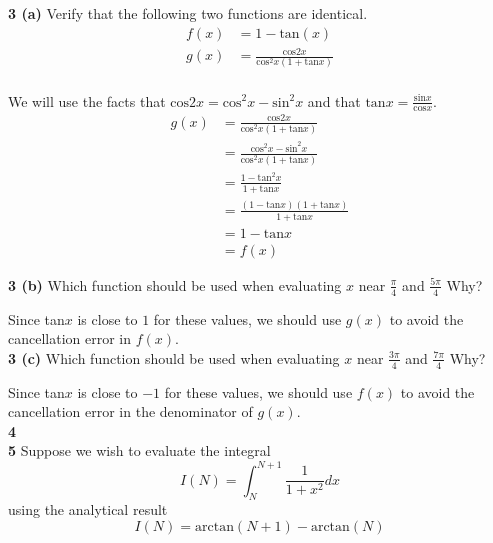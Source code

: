 \documentclass[12pt]{article}
\begin{document}
\hspace{-7 ex}\textbf{3 (a)} Verify that the following two functions are identical.\\
	\begin{align*}
		f(x) & = 1 - \text{tan}(x) \\
		g(x) & = \frac{\text{cos}2x}{\text{cos}^2x(1+\text{tan}x)} \\
	\end{align*}
	
	\bigbreak
	
	We will use the facts that $\text{cos}2x = \text{cos}^2x - \text{sin}^2x$ and that $\text{tan}x = \frac{\text{sin}x}{\text{cos}x}$. \\
	\begin{align*}
		g(x) & = \frac{\text{cos}2x}{\text{cos}^2x(1+\text{tan}x)} \\
		& = \frac{\text{cos}^2x - \text{sin}^2x}{\text{cos}^2x(1+\text{tan}x)} \\
		& = \frac{1 - \text{tan}^2x}{1+\text{tan}x} \\
		& = \frac{(1 - \text{tan}x)(1+\text{tan}x)}{1+\text{tan}x} \\
		& = 1 - \text{tan}x \\
		& = f(x)
	\end{align*}
	
\hspace{-7 ex}\textbf{3 (b)} Which function should be used when evaluating $x$ near $\frac{\pi}{4}$ and $\frac{5\pi}{4}$ Why?\bigbreak

	Since tan$x$ is close to $1$ for these values, we should use $g(x)$ to avoid the cancellation error in $f(x)$. \\

\hspace{-7 ex}\textbf{3 (c)} Which function should be used when evaluating $x$ near $\frac{3\pi}{4}$ and $\frac{7\pi}{4}$ Why?\bigbreak

	Since tan$x$ is close to $-1$ for these values, we should use $f(x)$ to avoid the cancellation error in the denominator of $g(x)$. \\

\hspace{-7 ex}\textbf{4}  \\
	
\hspace{-7 ex}\textbf{5}    Suppose we wish to evaluate the integral \\
	\begin{equation*}
			I(N) = \int_{N}^{N+1}\frac{1}{1+x^2}dx
	\end{equation*}
	using the analytical result \\
	\begin{equation}\label{prob2equ3}
		I(N) = \text{arctan}(N+1) - \text{arctan}(N)
	\end{equation}
	
\end{document}
